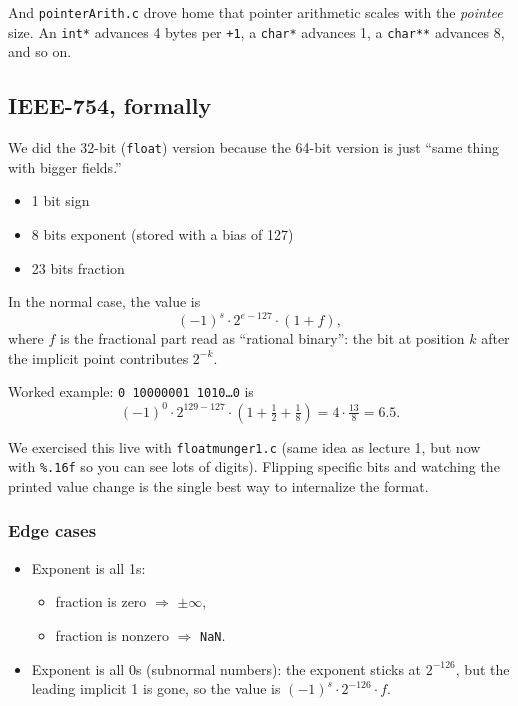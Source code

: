 \documentclass[11pt]{article}
\begin{document}
And \texttt{pointerArith.c} drove home that pointer arithmetic scales
with the \emph{pointee} size. An \texttt{int*} advances 4 bytes per
\texttt{+1}, a \texttt{char*} advances 1, a \texttt{char**} advances
8, and so on.

\subsection*{IEEE-754, formally}

We did the 32-bit (\texttt{float}) version because the 64-bit version
is just ``same thing with bigger fields.''

\begin{itemize}
  \item 1 bit sign
  \item 8 bits exponent (stored with a bias of 127)
  \item 23 bits fraction
\end{itemize}

In the normal case, the value is
\[
  (-1)^s \cdot 2^{e - 127} \cdot (1 + f),
\]
where $f$ is the fractional part read as ``rational binary'': the bit
at position $k$ after the implicit point contributes $2^{-k}$.

Worked example: \texttt{0 10000001 1010\ldots0} is
\[
  (-1)^0 \cdot 2^{129 - 127} \cdot (1 + \tfrac12 + \tfrac18)
  = 4 \cdot \tfrac{13}{8} = 6.5.
\]

We exercised this live with \texttt{floatmunger1.c} (same idea as
lecture 1, but now with \texttt{\%.16f} so you can see lots of digits).
Flipping specific bits and watching the printed value change is the
single best way to internalize the format.

\subsubsection*{Edge cases}

\begin{itemize}
  \item Exponent is all 1s:
    \begin{itemize}
      \item fraction is zero $\Rightarrow$ $\pm\infty$,
      \item fraction is nonzero $\Rightarrow$ \texttt{NaN}.
    \end{itemize}
  \item Exponent is all 0s (subnormal numbers): the exponent sticks at
    $2^{-126}$, but the leading implicit 1 is gone, so the value is
    $(-1)^s \cdot 2^{-126} \cdot f$.
\end{itemize}
\end{document}
